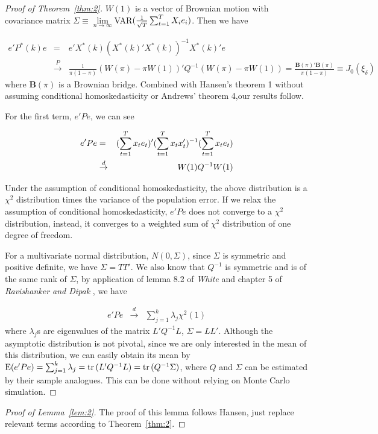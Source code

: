 \begin{proof}[Proof of Theorem~\ref{thm:2}]
\noindent $W(1)$ is a vector of Brownian motion with covariance matrix $\Sigma \equiv \lim\limits_{n\to\infty}$VAR$(\frac{1}{\sqrt{T}}\sum_{t=1}^{T} X_i e_i)$. Then we have

\begin{eqnarray*}
e'P^{*}(k)e & = & e'X^{*}(k)(X^{*}(k)'X^{*}(k))^{-1}X^{*}(k)'e \\
            & \stackrel{P}{\rightarrow} & \frac{1}{\pi(1-\pi)} (W(\pi) - \pi W(1))'Q^{-1}(W(\pi) - \pi W(1)) =  \frac{\mathbf{B}(\pi)'\mathbf{B}(\pi)}{\pi(1-\pi)}\equiv J_0(\xi_{\delta})
\end{eqnarray*}
where $\mathbf{B}(\pi)$ is a Brownian bridge. Combined with Hansen's \cite{hansen2009averaging} theorem 1 without assuming conditional homoskedasticity or Andrews' \cite{andrews93} theorem 4,our results follow.

For the first term, $e'Pe$, we can see

\begin{eqnarray*}
e'Pe & = & (\sum_{t=1}^{T} x_t e_t)'(\sum_{t=1}^{T} x_t x_t')^{-1}(\sum_{t=1}^{T} x_t e_t) \\
     & \stackrel{d}{\rightarrow} & W(1) Q^{-1} W(1)
\end{eqnarray*}

Under the assumption of conditional homoskedasticity, the above distribution is a $\chi^2$ distribution times the variance of the population error. If we relax the assumption of conditional homoskedasticity, $e'Pe$ does not converge to a $\chi^2$ distribution, instead, it converges to a weighted sum of $\chi^2$ distribution of one degree of freedom.

For a multivariate normal distribution, $N(0,\Sigma)$, since $\Sigma$ is symmetric and positive definite, we have $\Sigma = TT'$. We also know that $Q^{-1}$ is symmetric and is of the same rank of $\Sigma$,
by application of lemma 8.2 of \emph{White} \cite{white_mle_textbook} and chapter 5 of \emph{Ravishanker and Dipak} \cite{linear_model_textbook}, we have

\begin{eqnarray*}
e'Pe & \stackrel{d}{\rightarrow} & \sum_{j=1}^{k} \lambda_j \chi^2(1)
\end{eqnarray*}
where $\lambda_j$s are eigenvalues of the matrix $L'Q^{-1}L$, $\Sigma = LL'$. Although the asymptotic distribution is not pivotal, since we are only interested in the mean of this distribution, we can easily obtain its mean by $\mathrm{E}(e'Pe) = \sum_{j=1}^{k} \lambda_j = \operatorname{tr}{(L'Q^{-1}L)} = \operatorname{tr}{(Q^{-1} \Sigma)}$, where $Q$ and $\Sigma$ can be estimated by their sample analogues. This can be done without relying on Monte Carlo simulation.
\end{proof}
\begin{proof}[Proof of Lemma~\ref{lem:2}]
The proof of this lemma follows Hansen\cite{hansen2009averaging}, just replace relevant terms according to Theorem~\ref{thm:2}.
\end{proof}
